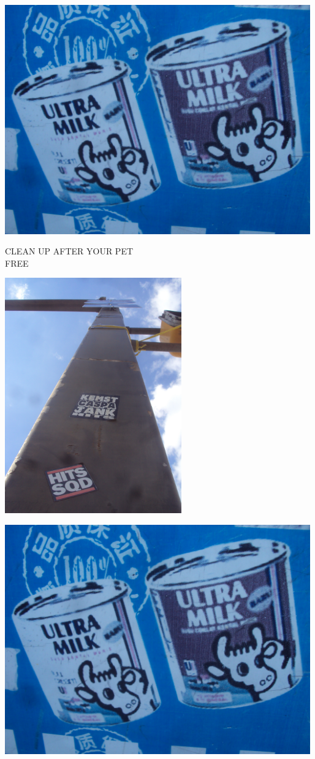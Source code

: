 \documentclass[10pt,letterpaper]{article}
\begin{document}
\vspace{0.25in}
\includegraphics[width=5.19in]{landscape.jpg}

CLEAN UP AFTER YOUR PET\\
FREE\\
\pagebreak

\includegraphics[height=4in]{portrait.jpg}

\vspace{0.25in}
\includegraphics[width=5.19in]{landscape.jpg}
\end{document}
